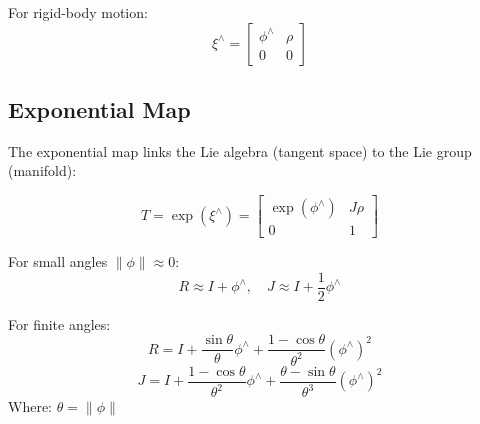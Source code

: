 \documentclass[11pt,a4paper]{article}
\begin{document}
For rigid-body motion:
\[
\xi^\wedge =
\begin{bmatrix}
\phi^\wedge & \rho \\
0 & 0
\end{bmatrix}
\]

\subsection*{Exponential Map}

The exponential map links the Lie algebra (tangent space) to the Lie group (manifold):

\[
T = \exp(\xi^\wedge) =
\begin{bmatrix}
\exp(\phi^\wedge) & J \rho \\
0 & 1
\end{bmatrix}
\]

For small angles \( \|\phi\| \approx 0 \):
\[
R \approx I + \phi^\wedge, \quad J \approx I + \frac{1}{2}\phi^\wedge
\]

For finite angles:
\[
R = I + \frac{\sin \theta}{\theta}\phi^\wedge + \frac{1 - \cos \theta}{\theta^2}(\phi^\wedge)^2
\]
\[
J = I + \frac{1 - \cos \theta}{\theta^2}\phi^\wedge + \frac{\theta - \sin \theta}{\theta^3}(\phi^\wedge)^2
\]
Where: \( \theta = \|\phi\| \)
\end{document}
